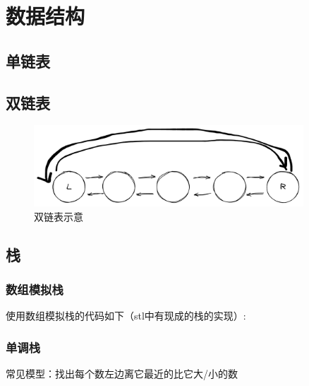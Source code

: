 \chapter{数据结构}

\begin{center}
\end{center}

\section{单链表}


\section{双链表}
\begin{figure}[H] %
\centering %
\includegraphics[width=0.9\textwidth]{images_content/4.png} %
\caption{双链表示意} %
\end{figure}



\section{栈}
\subsection{数组模拟栈}
使用数组模拟栈的代码如下（stl中有现成的栈的实现）:


\subsection{单调栈}
常见模型：找出每个数左边离它最近的比它大/小的数


